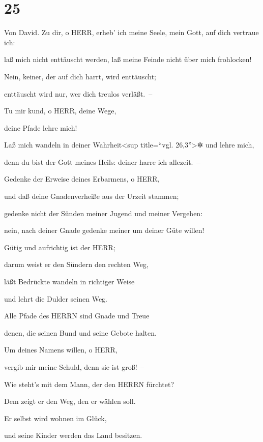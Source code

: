 \hypertarget{section-24}{%
\section{25}\label{section-24}}

Von David. Zu dir, o HERR, erheb' ich meine Seele,
mein Gott, auf dich vertraue ich:

laß mich nicht enttäuscht werden, laß meine Feinde nicht über mich
frohlocken!

Nein, keiner, der auf dich harrt, wird enttäuscht;

enttäuscht wird nur, wer dich treulos verläßt.~--

Tu mir kund, o HERR, deine Wege,

deine Pfade lehre mich!

Laß mich wandeln in deiner Wahrheit\textless sup
title=``vgl. 26,3''\textgreater✲ und lehre mich,

denn du bist der Gott meines Heils: deiner harre ich allezeit.~--

Gedenke der Erweise deines Erbarmens, o HERR,

und daß deine Gnadenverheiße aus der Urzeit stammen;

gedenke nicht der Sünden meiner Jugend und meiner
Vergehen:

nein, nach deiner Gnade gedenke meiner um deiner Güte willen!

Gütig und aufrichtig ist der HERR;

darum weist er den Sündern den rechten Weg,

läßt Bedrückte wandeln in richtiger Weise

und lehrt die Dulder seinen Weg.

Alle Pfade des HERRN sind Gnade und Treue

denen, die seinen Bund und seine Gebote halten.

Um deines Namens willen, o HERR,

vergib mir meine Schuld, denn sie ist groß!~--

Wie steht's mit dem Mann, der den HERRN fürchtet?

Dem zeigt er den Weg, den er wählen soll.

Er selbst wird wohnen im Glück,

und seine Kinder werden das Land besitzen.

